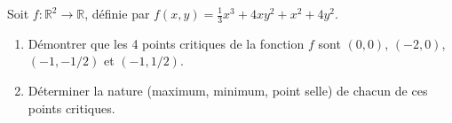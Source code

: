 \documentclass[a4paper]{tp_um}
\begin{document}
\exo{}
Soit $f : \mathbb R^2 \to \mathbb R$, définie par $f(x,y) = \tfrac13 x^3 + 4 xy^2 + x^2 +4y^2$.
\begin{enumerate}
    \item Démontrer que les 4 points critiques de la fonction $f$ sont $(0,0)$, $(-2,0)$, $(-1,-1/2)$ et $(-1,1/2)$.
        \blanc{8cm}



        \medskip

    \item Déterminer la nature (maximum, minimum, point selle) de chacun de ces points critiques.
        \blanc{10cm}




\end{enumerate}
\end{document}
